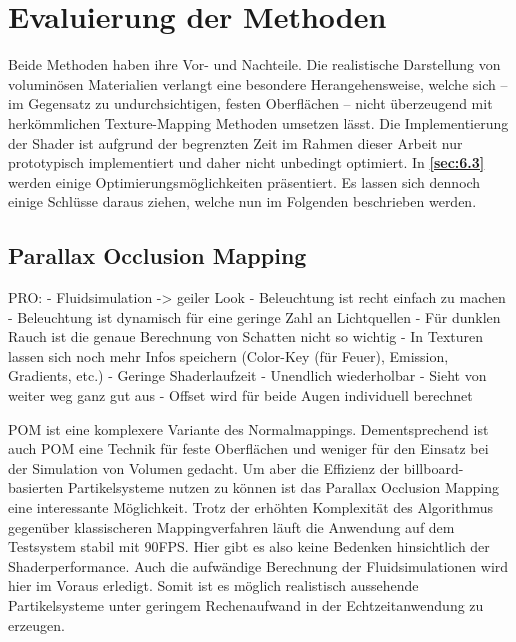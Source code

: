 \section{Evaluierung der Methoden}
\label{sec:5}

Beide Methoden haben ihre Vor- und Nachteile. Die realistische Darstellung von voluminösen Materialien verlangt 
eine besondere Herangehensweise, welche sich – im Gegensatz zu undurchsichtigen, festen Oberflächen – 
nicht überzeugend mit herkömmlichen Texture-Mapping Methoden umsetzen lässt. 
Die Implementierung der Shader ist aufgrund der 
begrenzten Zeit im Rahmen dieser Arbeit nur prototypisch implementiert und daher nicht unbedingt optimiert. 
In \textbf{\autoref{sec:6.3} } werden einige Optimierungsmöglichkeiten präsentiert. 
Es lassen sich dennoch einige Schlüsse daraus ziehen, welche nun im Folgenden beschrieben werden. 


\subsection{Parallax Occlusion Mapping}
\label{sec:5.1}

PRO: \newline
- Fluidsimulation -> geiler Look\newline
- Beleuchtung ist recht einfach zu machen \newline
- Beleuchtung ist dynamisch für eine geringe Zahl an Lichtquellen
- Für dunklen Rauch ist die genaue Berechnung von Schatten nicht so wichtig
- In Texturen lassen sich noch mehr Infos speichern (Color-Key (für Feuer), Emission, Gradients, etc.) \newline
- Geringe Shaderlaufzeit\newline
- Unendlich wiederholbar\newline
- Sieht von weiter weg ganz gut aus\newline
- Offset wird für beide Augen individuell berechnet\newline

POM ist eine komplexere Variante des Normalmappings. Dementsprechend ist auch POM eine Technik für feste Oberflächen und weniger
für den Einsatz bei der Simulation von Volumen gedacht. Um aber die Effizienz der billboard-basierten Partikelsysteme 
nutzen zu können ist das Parallax Occlusion Mapping eine interessante Möglichkeit. Trotz der erhöhten Komplexität des Algorithmus
gegenüber klassischeren Mappingverfahren läuft die Anwendung auf dem Testsystem stabil mit 90FPS. Hier gibt es also keine 
Bedenken hinsichtlich der Shaderperformance. Auch die aufwändige Berechnung der Fluidsimulationen wird hier im Voraus erledigt. Somit
ist es möglich realistisch aussehende Partikelsysteme unter geringem Rechenaufwand in der Echtzeitanwendung zu erzeugen.
 

